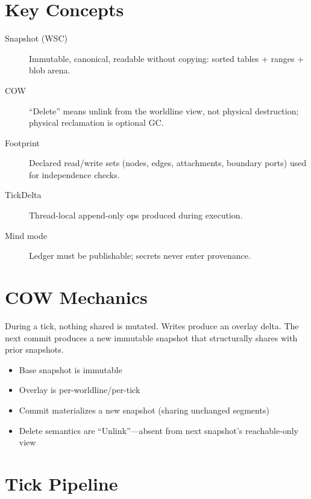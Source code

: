 \section{Key Concepts}

\begin{description}
    \item[Snapshot (WSC)] Immutable, canonical, readable without copying: sorted tables + ranges + blob arena.
    \item[COW] ``Delete'' means unlink from the worldline view, not physical destruction; physical reclamation is optional GC.
    \item[Footprint] Declared read/write sets (nodes, edges, attachments, boundary ports) used for independence checks.
    \item[TickDelta] Thread-local append-only ops produced during execution.
    \item[Mind mode] Ledger must be publishable; secrets never enter provenance.
\end{description}

\section{COW Mechanics}

During a tick, nothing shared is mutated. Writes produce an overlay delta. The next commit produces a new immutable snapshot that structurally shares with prior snapshots.

\begin{itemize}
    \item Base snapshot is immutable
    \item Overlay is per-worldline/per-tick
    \item Commit materializes a new snapshot (sharing unchanged segments)
    \item Delete semantics are ``Unlink''---absent from next snapshot's reachable-only view
\end{itemize}

\section{Tick Pipeline}

